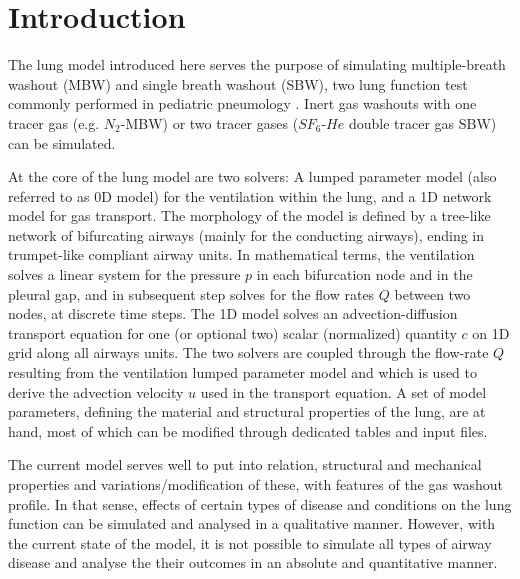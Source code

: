 \chapter*{Introduction}\label{cha:Introduction}
The lung model introduced here serves the purpose of simulating multiple-breath washout (MBW) and single breath washout (SBW), two lung function test commonly performed in pediatric pneumology \citep{Robinson2013, Singer2013}.
Inert gas washouts with one tracer gas (e.g. $N_2$-MBW) or two tracer gases ($SF_6$-$He$ double tracer gas SBW) can be simulated.

At the core of the lung model are two solvers: A lumped parameter model (also referred to as 0D model) for the ventilation within the lung, and a 1D network model for gas transport.
The morphology of the model is defined by a tree-like network of bifurcating airways (mainly for the conducting airways), ending in trumpet-like compliant airway units.
In mathematical terms, the ventilation solves a linear system for the pressure $p$ in each bifurcation node and in the pleural gap, and in subsequent step solves for the flow rates $Q$ between two nodes, at discrete time steps.
The 1D model solves an advection-diffusion transport equation for one (or optional two) scalar (normalized) quantity $c$ on 1D grid along all airways units.
The two solvers are coupled through the flow-rate $Q$ resulting from the ventilation lumped parameter model and which is used to derive the advection velocity $u$ used in the transport equation.
A set of model parameters, defining the material and structural properties of the lung, are at hand, most of which can be modified through dedicated tables and input files.

The current model serves well to put into relation, structural and mechanical properties and variations/modification of these, with features of the gas washout profile.
In that sense, effects of certain types of disease and conditions on the lung function can be simulated and analysed in a qualitative manner.
However, with the current state of the model, it is not possible to simulate all types of airway disease and analyse the their outcomes in an absolute and quantitative manner.

